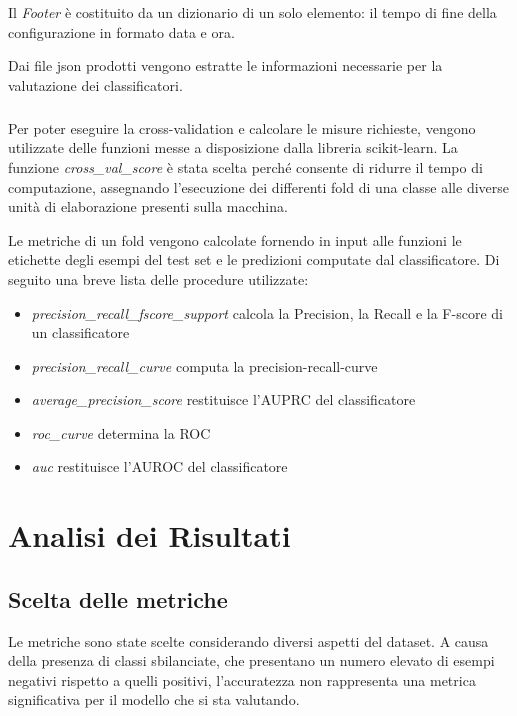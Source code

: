 \documentclass[12pt,a4paper,oneside,hidelinks]{report}
\begin{document}
Il \textit{Footer} è costituito da un dizionario di un solo elemento: il tempo di fine della configurazione in formato data e ora.

Dai file json prodotti vengono estratte le informazioni necessarie per la valutazione dei classificatori.

\paragraph*{}
Per poter eseguire la cross-validation e calcolare le misure richieste, vengono utilizzate delle funzioni messe a disposizione dalla libreria scikit-learn.
La funzione \textit{cross\_val\_score} è stata scelta perché consente di ridurre il tempo di computazione, assegnando l'esecuzione dei differenti fold di una classe alle diverse unità di elaborazione presenti sulla macchina.

Le metriche di un fold vengono calcolate fornendo in input alle funzioni le etichette degli esempi del test set e le predizioni computate dal classificatore. Di seguito una breve lista delle procedure utilizzate:

\begin{itemize}
\item \textit{precision\_recall\_fscore\_support} calcola la Precision, la Recall e la F-score di un classificatore

\item \textit{precision\_recall\_curve} computa la precision-recall-curve

\item \textit{average\_precision\_score} restituisce l'AUPRC del classificatore 

\item \textit{roc\_curve} determina la ROC

\item \textit{auc} restituisce l'AUROC del classificatore
\end{itemize}


\chapter{Analisi dei Risultati}
\label{chap:risultati}

\section{Scelta delle metriche}
Le metriche sono state scelte considerando diversi aspetti del dataset.
A causa della presenza di classi sbilanciate, che presentano un numero elevato di esempi negativi rispetto a quelli positivi, l'accuratezza non rappresenta una metrica significativa per il modello che si sta valutando.
\end{document}
